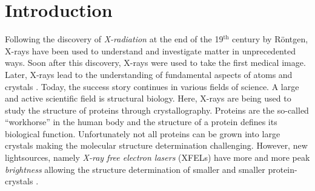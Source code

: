 \chapter{Introduction}
Following the discovery of \textit{X-radiation} at the end of the 19$^{\text{th}}$ century by R\"ontgen, X-rays have been used to understand and investigate matter in unprecedented ways. Soon after this discovery, X-rays were used to take the first medical image. Later, X-rays lead to the understanding of fundamental aspects of atoms \citep{Siegbahn-NP} and crystals \citep{Laue-NP,Bragg-NP}. Today, the success story continues in various fields of science. A large and active scientific field is structural biology. Here, X-rays are being used to study the structure of proteins through crystallography. Proteins are the so-called ``workhorse'' in the human body and the structure of a protein defines its biological function. Unfortunately not all proteins can be grown into large crystals making the molecular structure determination challenging. However, new lightsources, namely \textit{X-ray free electron lasers} (XFELs) \citep{Ackermann-2007-NPho} have more and more peak \textit{brightness} allowing the structure determination of smaller and smaller protein-crystals \citep{Chapman-2011-Nature}.\\[1\baselineskip]
